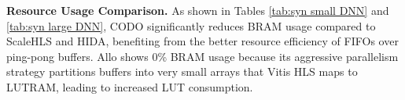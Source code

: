 \documentclass[conference]{IEEEtran}
\begin{document}
\textbf{Resource Usage Comparison.} 
As shown in Tables \ref{tab:syn small DNN} and \ref{tab:syn large DNN}, CODO significantly reduces BRAM usage compared to ScaleHLS and HIDA, benefiting from the better resource efficiency of FIFOs over ping-pong buffers. Allo shows 0\% BRAM usage because its aggressive parallelism strategy partitions buffers into very small arrays that Vitis HLS maps to LUTRAM, leading to increased LUT consumption.
\end{document}
